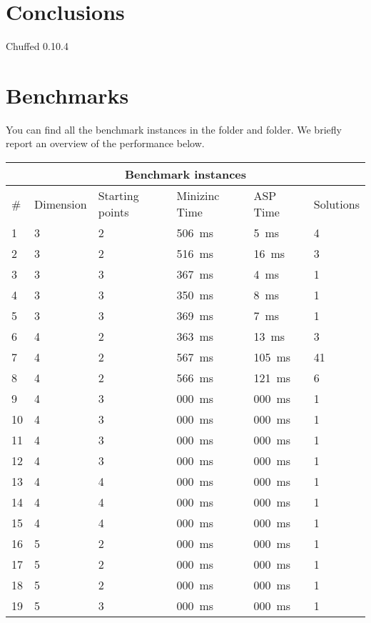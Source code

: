 \section{Conclusions}
Chuffed 0.10.4
\section{Benchmarks}\label{sec:benchmarks}
You can find all the benchmark instances in the  folder and  folder. We briefly report an overview of the performance below.

\begin{tabular}{ |p{0.3cm}||p{1.6cm}|p{1.6cm}||p{1.6cm}|p{1.6cm}|p{1.6cm}| }
    \hline
    \multicolumn{6}{|c|}{Benchmark instances} \\
    \hline
    \# &Dimension &Starting points &Minizinc Time &ASP Time &Solutions\\
    \hline
    1 &3 &2 &\SI{506}{ms} &\SI{5}{ms} &4 \\
    2 &3 &2 &\SI{516}{ms} &\SI{16}{ms} &3 \\
    3 &3 &3 &\SI{367}{ms} &\SI{4}{ms} &1 \\
    4 &3 &3 &\SI{350}{ms} &\SI{8}{ms} &1 \\
    5 &3 &3 &\SI{369}{ms} &\SI{7}{ms} &1 \\
    \hline
    6 &4 &2 &\SI{363}{ms} &\SI{13}{ms} &3 \\
    7 &4 &2 &\SI{567}{ms} &\SI{105}{ms} &41 \\
    8 &4 &2 &\SI{566}{ms} &\SI{121}{ms} &6 \\
    9 &4 &3 &\SI{000}{ms} &\SI{000}{ms} &1 \\
    10 &4 &3 &\SI{000}{ms} &\SI{000}{ms} &1 \\
    11 &4 &3 &\SI{000}{ms} &\SI{000}{ms} &1 \\
    12 &4 &3 &\SI{000}{ms} &\SI{000}{ms} &1 \\
    13 &4 &4 &\SI{000}{ms} &\SI{000}{ms} &1 \\
    14 &4 &4 &\SI{000}{ms} &\SI{000}{ms} &1 \\
    15 &4 &4 &\SI{000}{ms} &\SI{000}{ms} &1 \\
    \hline
    16 &5 &2 &\SI{000}{ms} &\SI{000}{ms} &1 \\
    17 &5 &2 &\SI{000}{ms} &\SI{000}{ms} &1 \\
    18 &5 &2 &\SI{000}{ms} &\SI{000}{ms} &1 \\
    19 &5 &3 &\SI{000}{ms} &\SI{000}{ms} &1 \\

\end{tabular}
